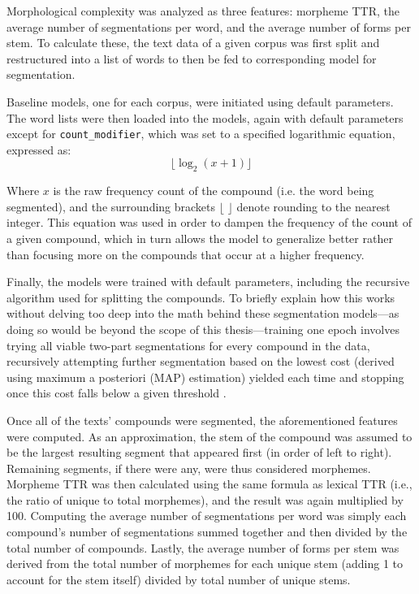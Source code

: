 \documentclass[12pt,a4paper]{article}
\numberwithin{figure}{section}
\numberwithin{table}{section}
\numberwithin{definition}{section}
\begin{document}
Morphological complexity was analyzed as three features: morpheme TTR, the average number of segmentations per word, and the average number of forms per stem. To calculate these, the text data of a given corpus was first split and restructured into a list of words to then be fed to corresponding model for segmentation.

Baseline models, one for each corpus, were initiated using default parameters. The word lists were then loaded into the models, again with default parameters except for \texttt{count\_modifier}, which was set to a specified logarithmic equation, expressed as: \[\lfloor\log_2(x + 1)\rfloor\]

Where \( x \) is the raw frequency count of the compound (i.e. the word being segmented), and the surrounding brackets \( \lfloor \) \( \rfloor \) denote rounding to the nearest integer. This equation was used in order to dampen the frequency of the count of a given compound, which in turn allows the model to generalize better rather than focusing more on the compounds that occur at a higher frequency.

Finally, the models were trained with default parameters, including the recursive algorithm used for splitting the compounds. To briefly explain how this works without delving too deep into the math behind these segmentation models---as doing so would be beyond the scope of this thesis---training one epoch involves trying all viable two-part segmentations for every compound in the data, recursively attempting further segmentation based on the lowest cost (derived using maximum a posteriori (MAP) estimation) yielded each time and stopping once this cost falls below a given threshold \parencite{Smit2014inproceedings}. 




Once all of the texts' compounds were segmented, the aforementioned features were computed. As an approximation, the stem of the compound was assumed to be the largest resulting segment that appeared first (in order of left to right). Remaining segments, if there were any, were thus considered morphemes. Morpheme TTR was then calculated using the same formula as lexical TTR (i.e., the ratio of unique to total morphemes), and the result was again multiplied by 100. Computing the average number of segmentations per word was simply each compound's number of segmentations summed together and then divided by the total number of compounds. Lastly, the average number of forms per stem was derived from the total number of morphemes for each unique stem (adding 1 to account for the stem itself) divided by total number of unique stems.
\end{document}
